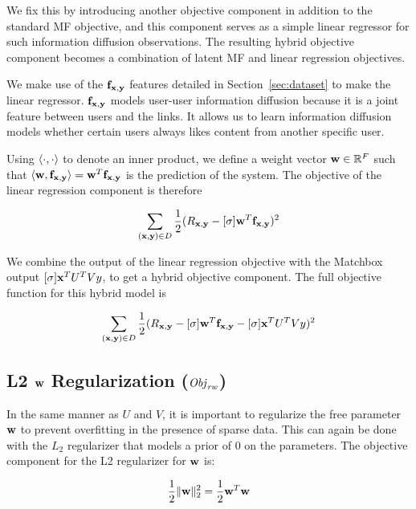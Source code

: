 We fix this by introducing another objective component in addition to the standard MF objective, and this component serves as a simple linear regressor for such information diffusion observations. The resulting hybrid objective component becomes a combination of latent MF and linear regression objectives.

We make use of the $\mathbf{f}_{\mathbf{x},\mathbf{y}}$ features detailed in Section~\ref{sec:dataset} to make the linear regressor. $\mathbf{f}_{\mathbf{x},\mathbf{y}}$ models user-user information diffusion because it is a joint feature between users and the links. It allows us to learn information diffusion models whether certain users always likes content from another specific user.


Using $\langle \cdot,\cdot \rangle$ to denote an inner product, we define a weight
vector $\mathbf{w} \in \mathbb{R}^F$ such that $\langle \mathbf{w}, \mathbf{f}_{\mathbf{x},\mathbf{y}} \rangle = \mathbf{w}^T \mathbf{f}_{\mathbf{x},\mathbf{y}}$ is the prediction of the system. The objective of the linear regression component is therefore

\begin{align*}
\sum_{(\mathbf{x},\mathbf{y}) \in D} \frac{1}{2} (R_{\mathbf{x},\mathbf{y}} - [\sigma] \mathbf{w}^T \mathbf{f}_{\mathbf{x},\mathbf{y}})^2
\end{align*}

We combine the output of the linear regression objective with the Matchbox output $[\sigma] \mathbf{x}^T U^T V y$, to get a hybrid objective component. The full objective function for this hybrid model is

\begin{align}
\sum_{(\mathbf{x},\mathbf{y}) \in D} \frac{1}{2} (R_{\mathbf{x},\mathbf{y}} - [\sigma] \mathbf{w}^T \mathbf{f}_{\mathbf{x},\mathbf{y}} - [\sigma] \mathbf{x}^T U^T V y)^2
\end{align}

\subsection{L2 $\mathbf{w}$ Regularization ($ \mathit{Obj}_{\mathit{rw}}$)}

In the same manner as $U$ and $V$, it is important to regularize the free parameter $\mathbf{w}$ to prevent overfitting in
the presence of sparse data. This can again be done with the
$L_2$ regularizer that models a prior of $0$ on the parameters. The objective component for the L2 regularizer for $\mathbf{w}$ is:

\begin{align}
\frac{1}{2} \| \mathbf{w} \|_2^2 = \frac{1}{2} \mathbf{w}^T \mathbf{w}
\end{align}

